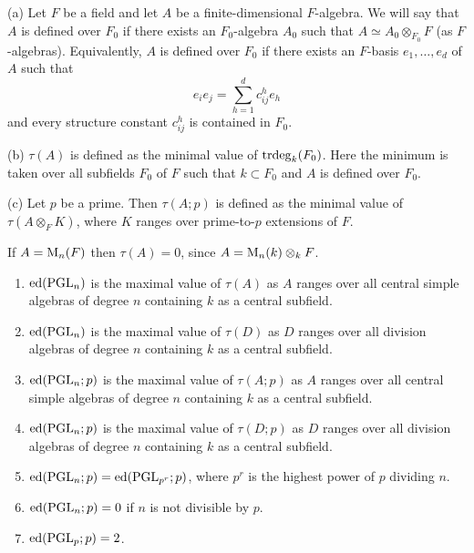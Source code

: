 \begin{defn} \label{def.tau}
(a) Let $F$ be a field and let $A$ be a finite-dimensional $F$-algebra.
We will say that $A$ is defined over $F_0$ if there exists an 
$F_0$-algebra $A_0$ such that $A \simeq A_0 \otimes _{F_0} F$ (as 
$F$-algebras). Equivalently, $A$ is defined over $F_0$ if there exists
an $F$-basis $e_1, \ldots, e_d$ of $A$ such that $$e_i e_j = \sum_{h=1}^d
c_{ij}^h e_h $$ and every structure constant $c_{ij}^h$ is
contained in $F_0$.

\smallskip
(b) $\tau(A)$ is defined as the minimal value of $\operatorname{trdeg}_k(F_0)$. Here 
the minimum is taken over all subfields $F_0$ of $F$ such that $k \subset F_0$
and $A$ is defined over $F_0$.

\smallskip
(c) Let $p$ be a prime. Then $\tau(A; p)$ is defined as the minimal 
value of $\tau(A \otimes_F K)$, where $K$ ranges over prime-to-$p$ extensions
of $F$.
\end{defn}

\begin{example} If $A = \operatorname{M}_n(F)$ then $\tau(A) = 0$, since $A = \operatorname{M}_n(k) 
\otimes_k F$. 
\end{example}

\begin{lem} \label{lem.pgln}
\begin{enumerate}
\item $\operatorname{ed}(\operatorname{PGL}_n)$ is the maximal value of  $\tau(A)$ as $A$ ranges over all
central simple 
algebras of degree $n$ containing $k$ as a central subfield.

\item $\operatorname{ed}(\operatorname{PGL}_n)$ is the maximal value of  $\tau(D)$ as $D$ ranges over all
division algebras of degree $n$ containing $k$ as a central subfield.

\item $\operatorname{ed}(\operatorname{PGL}_n; p)$ is the maximal value of  $\tau(A; p)$ 
as $A$ ranges over all central simple
algebras of degree $n$ containing $k$ as a central subfield.

\item $\operatorname{ed}(\operatorname{PGL}_n; p)$ is the maximal value of  $\tau(D; p)$ 
as $D$ ranges over all
division algebras of degree $n$ containing $k$ as a central subfield.

\item $\operatorname{ed}(\operatorname{PGL}_n; p) = \operatorname{ed}(\operatorname{PGL}_{p^r}; p)$, where $p^r$ is 
the highest power of $p$ dividing $n$.

\item $\operatorname{ed}(\operatorname{PGL}_n; p) = 0$ if $n$ is not divisible by $p$.

\item $\operatorname{ed}(\operatorname{PGL}_p; p) = 2$.
\end{enumerate}
\end{lem}

